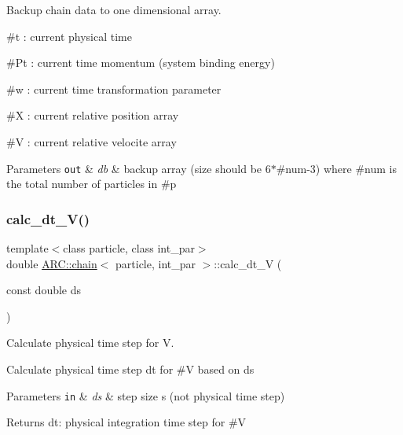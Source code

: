 Backup chain data to one dimensional array.
\begin{DoxyItemize}
\item \#t \+: current physical time
\item \#\+Pt \+: current time momentum (system binding energy)
\item \#w \+: current time transformation parameter
\item \#X \+: current relative position array
\item \#V \+: current relative velocite array 
\begin{DoxyParams}[1]{Parameters}
\mbox{\tt out}  & {\em db} & backup array (size should be 6$\ast$\#num-\/3) where \#num is the total number of particles in \#p \\
\hline
\end{DoxyParams}

\end{DoxyItemize}\hypertarget{classARC_1_1chain_a1453e04d5f3e15c51cca5de13832732d}{}\label{classARC_1_1chain_a1453e04d5f3e15c51cca5de13832732d} 
\subsubsection{\texorpdfstring{calc\+\_\+dt\+\_\+\+V()}{calc\_dt\_V()}}
{\footnotesize\ttfamily template$<$class particle, class int\+\_\+par$>$ \\
double \hyperlink{classARC_1_1chain}{A\+R\+C\+::chain}$<$ particle, int\+\_\+par $>$\+::calc\+\_\+dt\+\_\+V (\begin{DoxyParamCaption}\item[{const double}]{ds }\end{DoxyParamCaption})\hspace{0.3cm}{\ttfamily [inline]}}



Calculate physical time step for V. 

Calculate physical time step dt for \#V based on ds 
\begin{DoxyParams}[1]{Parameters}
\mbox{\tt in}  & {\em ds} & step size s (not physical time step) \\
\hline
\end{DoxyParams}
\begin{DoxyReturn}{Returns}
dt\+: physical integration time step for \#V 
\end{DoxyReturn}
\hypertarget{classARC_1_1chain_a146941e5213125cc4a1c30622eed4568}{}\label{classARC_1_1chain_a146941e5213125cc4a1c30622eed4568} 
